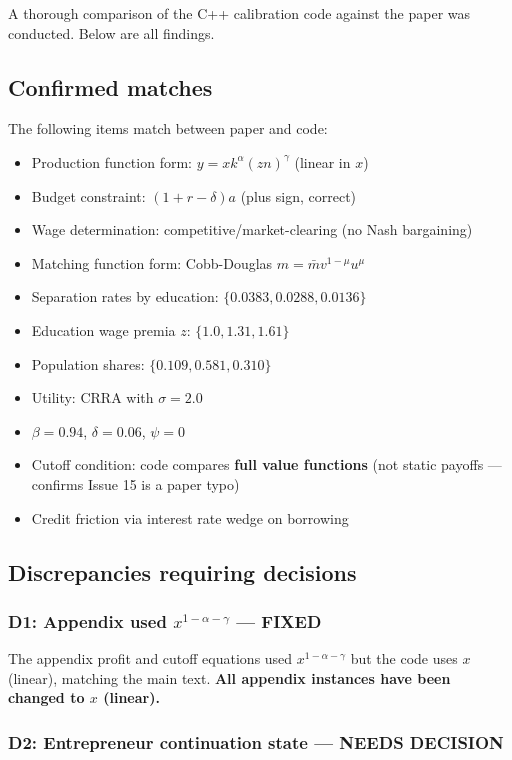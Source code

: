 \documentclass[11pt]{article}
\begin{document}
A thorough comparison of the C++ calibration code against the paper was conducted. Below are all findings.

\subsection*{Confirmed matches}

The following items match between paper and code:
\begin{itemize}
    \item Production function form: $y = xk^{\alpha}(zn)^{\gamma}$ (linear in $x$)
    \item Budget constraint: $(1+r-\delta)a$ (plus sign, correct)
    \item Wage determination: competitive/market-clearing (no Nash bargaining)
    \item Matching function form: Cobb-Douglas $m = \bar{m}v^{1-\mu}u^{\mu}$
    \item Separation rates by education: $\{0.0383, 0.0288, 0.0136\}$
    \item Education wage premia $z$: $\{1.0, 1.31, 1.61\}$
    \item Population shares: $\{0.109, 0.581, 0.310\}$
    \item Utility: CRRA with $\sigma = 2.0$
    \item $\beta = 0.94$, $\delta = 0.06$, $\psi = 0$
    \item Cutoff condition: code compares \textbf{full value functions} (not static payoffs --- confirms Issue 15 is a paper typo)
    \item Credit friction via interest rate wedge on borrowing
\end{itemize}

\subsection*{Discrepancies requiring decisions}

\subsubsection*{D1: Appendix used $x^{1-\alpha-\gamma}$ --- FIXED}

The appendix profit and cutoff equations used $x^{1-\alpha-\gamma}$ but the code uses $x$ (linear), matching the main text. \textbf{All appendix instances have been changed to $x$ (linear).}

\subsubsection*{D2: Entrepreneur continuation state --- NEEDS DECISION}
\end{document}

